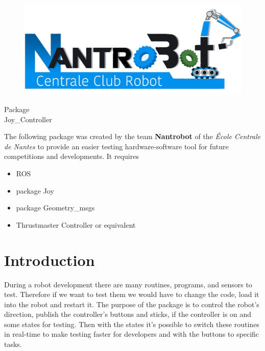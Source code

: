 \documentclass[letterpaper, openright, 11pt]{article}
\begin{document}

\begin{center}

\begin{figure}[H]
	\centering
	\includegraphics[scale=0.15]{Nantrobot1.JPG}
\end{figure}
\noindent\makebox[\linewidth]{\rule{\paperwidth}{0.4pt}}

\Large Package\\
\LARGE Joy\_Controller\\

\noindent\makebox[\linewidth]{\rule{\paperwidth}{0.4pt}}

\end{center}

The following package was created by the team \textbf{Nantrobot} of the \textit{École Centrale de Nantes} to provide an easier testing hardware-software tool for future competitions and developments. It requires
\begin{itemize}
\item ROS
\item package Joy
\item package Geometry\_msgs
\item Thrustmaster Controller or equivalent
\end{itemize} 

\section{Introduction}

During a robot development there are many routines, programs, and sensors to test. Therefore if we want to test them we would have to change the code, load it into the robot and restart it. The purpose of the package is to control the robot's direction, publish the controller's buttons and sticks, if the controller is on and some states for testing. Then with the states it's possible to switch these routines in real-time to make testing faster for developers and with the buttons to specific tasks. 
\end{document}
